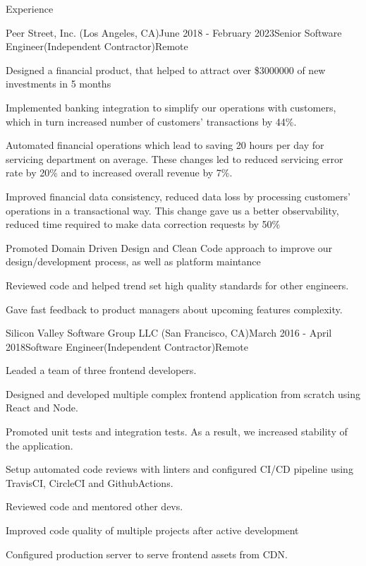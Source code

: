 \documentclass{resume}
\begin{document}
  \begin{rSection}{Experience}
    \begin{rSubsection}{Peer Street, Inc. (Los Angeles, CA)}{June 2018 - February 2023}{Senior Software Engineer(Independent Contractor)}{Remote}
    \item Designed a financial product, that helped to attract over \$3000000 of new investments in 5 months
    \item Implemented banking integration to simplify our operations with customers, which in turn increased number of customers' transactions by 44\%.
    \item Automated financial operations which lead to saving 20 hours per day for servicing department on average. These changes led to reduced servicing error rate by 20\% and to increased overall revenue by 7\%.
    \item Improved financial data consistency, reduced data loss by processing customers' operations in a transactional way. This change gave us a better observability, reduced time required to make data correction requests by 50\%
    \item Promoted Domain Driven Design and Clean Code approach to improve our design/development process, as well as platform maintance
    \item Reviewed code and helped trend set high quality standards for other engineers.
    \item Gave fast feedback to product managers about upcoming features complexity.
    \end{rSubsection}

    \begin{rSubsection}{Silicon Valley Software Group LLC (San Francisco, CA)}{March 2016 - April 2018}{Software Engineer(Independent Contractor)}{Remote}
    \item Leaded a team of three frontend developers.
    \item Designed and developed multiple complex frontend application from scratch using React and Node.
    \item Promoted unit tests and integration tests. As a result, we increased stability of the application.
    \item Setup automated code reviews with linters and configured CI/CD pipeline using TravisCI, CircleCI and GithubActions.
    \item Reviewed code and mentored other devs.
    \item Improved code quality of multiple projects after active development
    \item Configured production server to serve frontend assets from CDN.
    \end{rSubsection}


\end{rSection}
\end{document}
